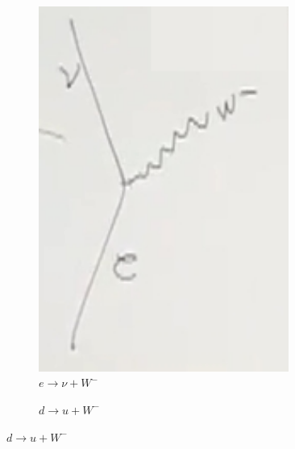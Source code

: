 \documentclass[]{article}
\begin{document}
\begin{figure}[H]
	\caption{W are like photons or gluons}\label{fig:W:photon:fluon}
	\begin{subfigure}[t]{0.2\textwidth}
		\caption{$e \rightarrow\nu + W^-$}\label{fig:2-5-W1}
		\includegraphics[width=0.9\textwidth]{2-5-W1}
	\end{subfigure}
	\begin{subfigure}[t]{0.2\textwidth}
		\caption{$d \rightarrow u + W^-$}

\end{subfigure}
\end{figure}
\end{document}
